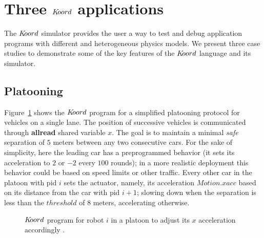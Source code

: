 \section{Three $K\kern-2pt oord$ applications}
\label{sec:experims}
The $K\kern-2pt oord$ simulator provides the user a way to test and  debug application programs with different and heterogeneous physics models. We present three case studies to demonstrate some of the key features of the $K\kern-2pt oord$ language and its  simulator.

\subsection{Platooning}
\label{sec:platooning}
Figure~\ref{fig:platooningapp} shows the $K\kern-2pt oord$ program for a simplified platooning protocol for vehicles on a single lane. The position of successive vehicles is communicated through  {\bf allread} shared variable $\mathit{x}$. The  goal is to maintain a minimal  \emph{safe} separation  of $5$ meters between any two consecutive cars. For the sake of simplicity, here the leading car  has a preprogrammed behavior (it sets its acceleration to $2$ or $-2$ every $100$ rounds); in a more realistic deployment this behavior could be based on speed limits or other traffic. 
Every other car in the platoon with pid $i$ sets the actuator, namely, its acceleration $\mathit{Motion.xacc}$ based on its distance from the car with pid $i+1$; slowing down when the separation is less than the $\mathit{threshold}$ of $8$ meters, accelerating otherwise. 

\begin{figure}[ht!]
\begin{mdframed}
    \noindent
    \begin{center}
        \scriptsize
        {}
        {} 
    \end{center}
\end{mdframed}
    \caption{$K\kern-2pt oord$ program for robot $i$ in a platoon to adjust its $x$ acceleration accordingly .}
    \label{fig:platooningapp}
\end{figure}

